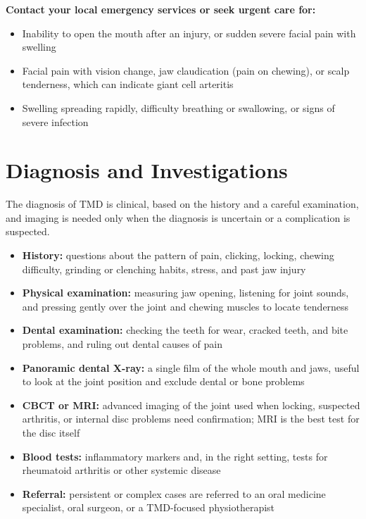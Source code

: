 \textbf{Contact your local emergency services or seek urgent care for:}
\begin{itemize}
    \item Inability to open the mouth after an injury, or sudden severe facial pain with swelling
    \item Facial pain with vision change, jaw claudication (pain on chewing), or scalp tenderness, which can indicate giant cell arteritis
    \item Swelling spreading rapidly, difficulty breathing or swallowing, or signs of severe infection
\end{itemize}

\section*{Diagnosis and Investigations}
The diagnosis of TMD is clinical, based on the history and a careful examination, and imaging is needed only when the diagnosis is uncertain or a complication is suspected.

\begin{itemize}
    \item \textbf{History:} questions about the pattern of pain, clicking, locking, chewing difficulty, grinding or clenching habits, stress, and past jaw injury
    \item \textbf{Physical examination:} measuring jaw opening, listening for joint sounds, and pressing gently over the joint and chewing muscles to locate tenderness
    \item \textbf{Dental examination:} checking the teeth for wear, cracked teeth, and bite problems, and ruling out dental causes of pain
    \item \textbf{Panoramic dental X-ray:} a single film of the whole mouth and jaws, useful to look at the joint position and exclude dental or bone problems
    \item \textbf{CBCT or MRI:} advanced imaging of the joint used when locking, suspected arthritis, or internal disc problems need confirmation; MRI is the best test for the disc itself
    \item \textbf{Blood tests:} inflammatory markers and, in the right setting, tests for rheumatoid arthritis or other systemic disease
    \item \textbf{Referral:} persistent or complex cases are referred to an oral medicine specialist, oral surgeon, or a TMD-focused physiotherapist
\end{itemize}

